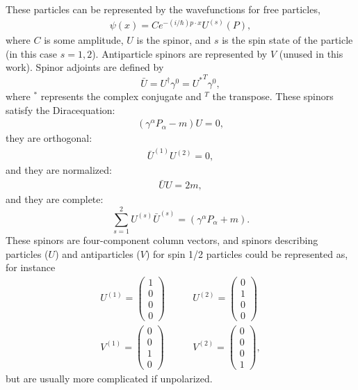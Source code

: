 These particles can be represented by the wavefunctions for free particles,
\begin{gather*}
\psi(x)=Ce^{-(i/\hbar)p\cdot x} U^{(s)} (P),
\end{gather*}
where $C$ is some amplitude, $U$ is the spinor, and $s$ is the spin state of the
particle (in this
case $s=1,2$). Antiparticle spinors are represented by $V$ (unused in this work).
Spinor adjoints are defined by
\begin{equation}\label{eqn:spinorAdjoint}
\bar{U}=U^\dagger\gamma^0={U^*}^T \gamma^0,
\end{equation}
where $^*$ represents the complex conjugate and $^T$ the transpose. These
spinors satisfy the Diracequation:
\begin{align*}
(\gamma^\alpha P_\alpha - m)U=0,
\end{align*}
they are orthogonal:
\begin{align*}
\bar{U}^{(1)}U^{(2)}=0,
\end{align*}
and they are normalized:
\begin{align*}
\bar{U}U=2m,
\end{align*}
and they are complete:
\begin{equation}\label{eqn:spinorCompleteness}
\sum_{s=1}^2 U^{(s)}\bar{U}^{(s)}=(\gamma^\alpha P_\alpha + m).
\end{equation}
These spinors are four-component column vectors, and spinors describing particles ($U$) and antiparticles ($V$) for spin 1/2 particles could be represented as, for instance
\begin{align*}
U^{(1)}=
	\begin{pmatrix}
	1\\0\\0\\0
	\end{pmatrix}
&\qquad
U^{(2)}=
	\begin{pmatrix}
	0\\1\\0\\0
	\end{pmatrix}
\\
V^{(1)}=
	\begin{pmatrix}
	0\\0\\1\\0
	\end{pmatrix}
&\qquad
V^{(2)}=
	\begin{pmatrix}
	0\\0\\0\\1
	\end{pmatrix},
\end{align*}
but are usually more complicated if unpolarized.

